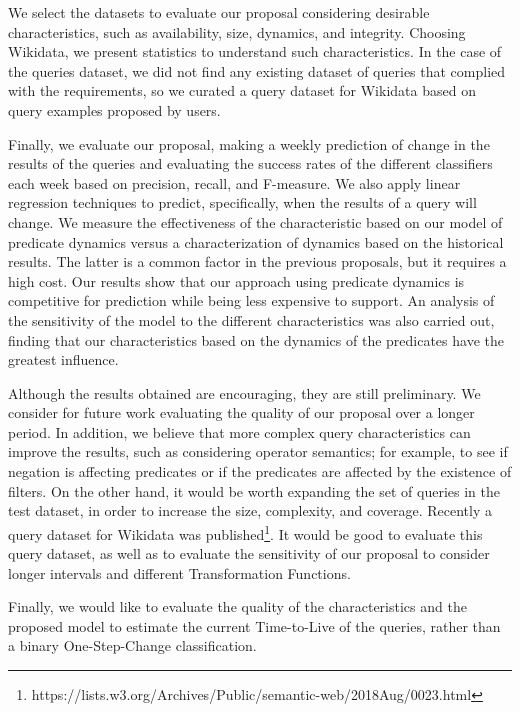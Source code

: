 \documentclass[runningheads]{llncs}
\begin{document}
We select the datasets to evaluate our proposal considering desirable characteristics, such as availability, size, dynamics, and integrity. Choosing Wikidata, we present statistics to understand such characteristics. In the case of the queries dataset, we did not find any existing dataset of queries that complied with the requirements, so we curated a query dataset for Wikidata based on query examples proposed by users.

Finally, we evaluate our proposal, making a weekly prediction of change in the results of the queries and evaluating the success rates of the different classifiers each week based on precision, recall, and F-measure. We also apply linear regression techniques to predict, specifically, when the results of a query will change.
We measure the effectiveness of the characteristic based on our model of predicate dynamics versus a characterization of dynamics based on the historical results. The latter is a common factor in the previous proposals, but it requires a high cost. Our results show that our approach using predicate dynamics is competitive for prediction while being less expensive to support. An analysis of the sensitivity of the model to the different characteristics was also carried out, finding that our characteristics based on the dynamics of the predicates have the greatest influence.    

Although the results obtained are encouraging, they are still preliminary. We consider for future work evaluating the quality of our proposal over a longer period. In addition, we believe that more complex query characteristics can improve the results, such as considering operator semantics; for example, to see if negation is affecting predicates or if the predicates are affected by the existence of filters. On the other hand, it would be worth expanding the set of queries in the test dataset, in order to increase the size, complexity, and coverage. Recently a query dataset for Wikidata was published\footnote{https://lists.w3.org/Archives/Public/semantic-web/2018Aug/0023.html}. It would be good to evaluate this query dataset, as well as to evaluate the sensitivity of our proposal to consider longer intervals and different Transformation Functions.

Finally, we would like to evaluate the quality of the characteristics and the proposed model to estimate the current Time-to-Live of the queries, rather than a binary One-Step-Change classification.




\end{document}
